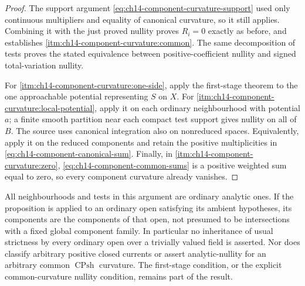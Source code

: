 \begin{proof}
The support argument
\eqref{eq:ch14-component-curvature-support} used only continuous
multipliers and equality of canonical curvature, so it still applies.
Combining it with the just proved nullity proves $R_i=0$ exactly as
before, and establishes
\cref{itm:ch14-component-curvature:common}.
The same decomposition of tests proves the stated equivalence between
positive-coefficient nullity and signed total-variation nullity.

For \cref{itm:ch14-component-curvature:one-side}, apply the first-stage
theorem \cite[Corollary~16.9.4]{CLD25} to the one approachable potential
representing $S$ on $X$.  For
\cref{itm:ch14-component-curvature:local-potential}, apply it on each
ordinary neighbourhood with potential $a$; a finite smooth partition
near each compact test support gives nullity on all of $B$.  The source
uses canonical integration also on nonreduced spaces.  Equivalently,
apply it on the reduced components and retain the positive
multiplicities in \eqref{eq:ch14-component-canonical-sum}.
Finally, in \cref{itm:ch14-component-curvature:zero},
\eqref{eq:ch14-component-common-sums} is a positive weighted sum equal
to zero, so every component curvature already vanishes.
\end{proof}

All neighbourhoods and tests in this argument are ordinary analytic
ones.  If the proposition is applied to an ordinary open satisfying its
ambient hypotheses, its components are the components of that open,
not presumed to be intersections with a fixed global component family.
In particular no inheritance of usual strictness by every ordinary open
over a trivially valued field is asserted.
Nor does  classify arbitrary positive
closed currents or assert analytic-nullity for an arbitrary common
$\operatorname{CPsh}$ curvature.  The first-stage condition, or the
explicit common-curvature nullity condition, remains part of the result.


